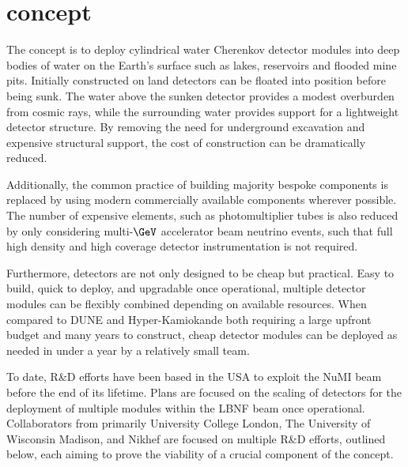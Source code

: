 \section{\chips concept} %
\label{sec:chips_concept} %

The \chips concept is to deploy cylindrical water Cherenkov detector modules into deep bodies of
water on the Earth's surface such as lakes, reservoirs and flooded mine pits. Initially
constructed on land \chips detectors can be floated into position before being sunk. The water
above the sunken detector provides a modest overburden from cosmic rays, while the surrounding
water provides support for a lightweight detector structure. By removing the need for underground
excavation and expensive structural support, the cost of construction can be dramatically reduced.

Additionally, the common practice of building majority bespoke components is replaced by using
modern commercially available components wherever possible. The number of expensive elements, such
as photomultiplier tubes is also reduced by only considering multi-$\GeV$ accelerator beam
neutrino events, such that full high density and high coverage detector instrumentation is not
required.

Furthermore, \chips detectors are not only designed to be cheap but practical. Easy to build,
quick to deploy, and upgradable once operational, multiple detector modules can be flexibly
combined depending on available resources. When compared to DUNE and Hyper-Kamiokande both
requiring a large upfront budget and many years to construct, cheap \chips detector modules can be
deployed as needed in under a year by a relatively small team.

To date, \chips R\&D efforts have been based in the USA to exploit the NuMI beam before the end of
its lifetime. Plans are focused on the scaling of \chips detectors for the deployment of multiple
modules within the LBNF beam once operational. Collaborators from primarily University College
London, The University of Wisconsin Madison, and Nikhef are focused on multiple R\&D efforts,
outlined below, each aiming to prove the viability of a crucial component of the \chips concept.

